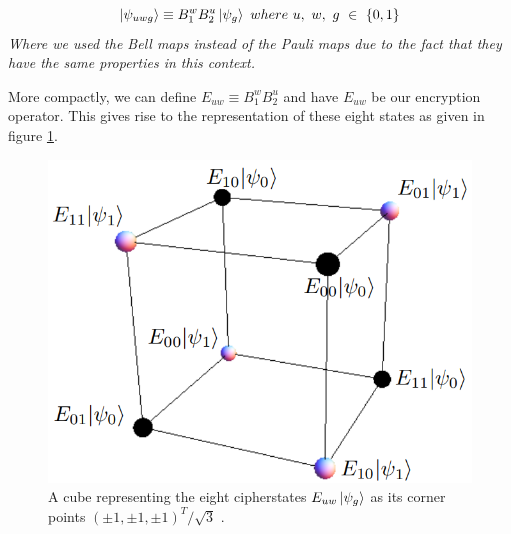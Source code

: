 \documentclass[]{article}
\begin{document}
\begin{equation}
	\label{equation:EightStatePaulis}
	\ket{\psi_{uwg}} \equiv B_1^w B_2^u\ket{\psi_{g}}~where~ u,~ w,~ g~ \in~ \{0,1\}
\end{equation}
\textit{Where we used the Bell maps instead of the Pauli maps due to the fact that they have the same properties in this context.}

More compactly, we can define $E_{uw} \equiv B_1^w B_2^u$ and have $E_{uw}$ be our encryption operator. This gives rise to the representation of these eight states as given in figure \ref{fig:eightstatecube}.

\begin{center}
\begin{figure}
	\begin{center}
	\includegraphics[width=0.5\linewidth]{Eightstatecube.png}
	\caption{A cube representing the eight cipherstates $E_{uw}\ket{\psi_{g}}$ as its corner points $(\pm1,\pm1,\pm1)^T/\sqrt{3}$ \cite{DeVries2016}.}
	\label{fig:eightstatecube}
	\end{center}
\end{figure}
\end{center}
\end{document}
